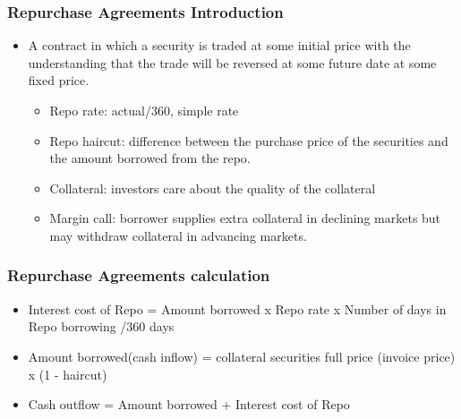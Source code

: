 \subsubsection{Repurchase Agreements Introduction}
\begin{itemize}
\item A contract in which a security is traded at some initial price with the understanding that the trade will be reversed at some future date at some fixed price.
    \begin{itemize}
    \item Repo rate: actual/360, simple rate
    \item Repo haircut: difference between the purchase price of the securities and the amount borrowed from the repo.
    \item Collateral: investors care about the quality of the collateral
    \item Margin call: borrower supplies extra collateral in declining markets but may withdraw collateral in advancing markets.
    \end{itemize}
    
\end{itemize}





\subsubsection{Repurchase Agreements calculation}
\begin{itemize}
\item Interest cost of Repo = Amount borrowed x Repo rate x Number of days in Repo borrowing /360 days
\item Amount borrowed(cash inflow) = collateral securities full price (invoice price) x (1 - haircut)
\item Cash outflow = Amount borrowed + Interest cost of Repo
\end{itemize}




